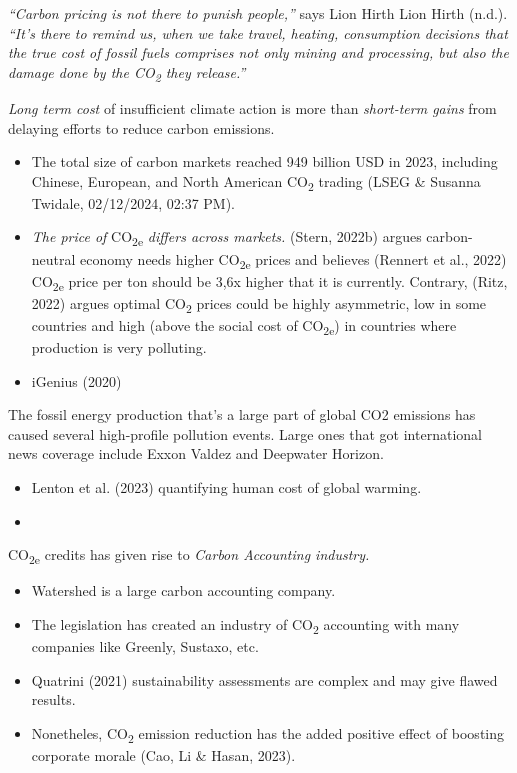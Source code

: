 \documentclass[
  letterpaper,
  DIV=11,
  numbers=noendperiod]{scrartcl}
\providecommand{\tightlist}{%
  \setlength{\itemsep}{0pt}\setlength{\parskip}{0pt}}\usepackage{longtable,booktabs,array}
\begin{document}
\emph{``Carbon pricing is not there to punish people,''} says Lion Hirth
Lion Hirth (n.d.). \emph{``It's there to remind us, when we take travel,
heating, consumption decisions that the true cost of fossil fuels
comprises not only mining and processing, but also the damage done by
the CO\textsubscript{2} they release.''}

\emph{Long term cost} of insufficient climate action is more than
\emph{short-term gains} from delaying efforts to reduce carbon
emissions.

\begin{itemize}
\item
  The total size of carbon markets reached 949 billion USD in 2023,
  including Chinese, European, and North American CO\textsubscript{2}
  trading (LSEG \& Susanna Twidale, 02/12/2024, 02:37 PM).
\item
  \emph{The price of} CO\textsubscript{2e} \emph{differs across
  markets.} (Stern, 2022b) argues carbon-neutral economy needs higher
  CO\textsubscript{2e} prices and believes (Rennert et al., 2022)
  CO\textsubscript{2e} price per ton should be 3,6x higher that it is
  currently. Contrary, (Ritz, 2022) argues optimal CO\textsubscript{2}
  prices could be highly asymmetric, low in some countries and high
  (above the social cost of CO\textsubscript{2e}) in countries where
  production is very polluting.
\item
  iGenius (2020)
\end{itemize}

The fossil energy production that's a large part of global CO2 emissions
has caused several high-profile pollution events. Large ones that got
international news coverage include Exxon Valdez and Deepwater Horizon.

\begin{itemize}
\tightlist
\item
  Lenton et al. (2023) quantifying human cost of global warming.
\item
\end{itemize}

CO\textsubscript{2e} credits has given rise to \emph{Carbon Accounting
industry.}

\begin{itemize}
\item
  Watershed is a large carbon accounting company.
\item
  The legislation has created an industry of CO\textsubscript{2}
  accounting with many companies like Greenly, Sustaxo, etc.
\item
  Quatrini (2021) sustainability assessments are complex and may give
  flawed results.
\item
  Nonetheles, CO\textsubscript{2} emission reduction has the added
  positive effect of boosting corporate morale (Cao, Li \& Hasan, 2023).
\end{itemize}
\end{document}
